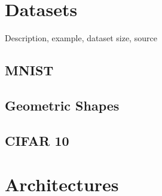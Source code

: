 \section{Datasets}
Description, example, dataset size, source
\subsection{MNIST}

\subsection{Geometric Shapes}

\subsection{CIFAR 10}

\section{Architectures}